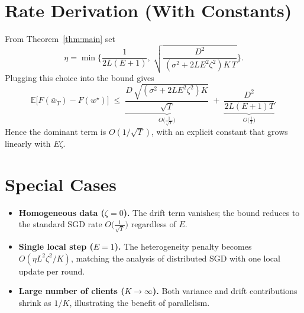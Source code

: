 \documentclass[11pt]{article}
\newcommand{\E}{\mathbb{E}}
\begin{document}
\section*{Rate Derivation (With Constants)}
From Theorem~\ref{thm:main} set
\[
\eta = \min\Big\{\frac{1}{2L(E+1)},\;\sqrt{\frac{D^2}{\,(\sigma^2+2L E^2\zeta^2)K\,T}}\Big\}.
\]
Plugging this choice into the bound gives
\[
\E\!\big[F(\bar w_T)-F(w^\star)\big]
\;\le\;
\underbrace{\frac{D\,\sqrt{(\sigma^2+2L E^2\zeta^2)K}}{\sqrt{T}}}_{\displaystyle O\!\big(\tfrac{1}{\sqrt{T}}\big)}
\;+\;
\underbrace{\frac{D^2}{2L(E+1)T}}_{\displaystyle O\!\big(\tfrac{1}{T}\big)} .
\]
Hence the dominant term is $O(1/\sqrt{T})$, with an explicit constant that grows linearly with $E\zeta$.

\section*{Special Cases}
\begin{itemize}
\item \textbf{Homogeneous data ($\zeta=0$).} The drift term vanishes; the bound reduces to the standard SGD rate $O\!\big(\frac{1}{\sqrt{T}}\big)$ regardless of $E$.
\item \textbf{Single local step ($E=1$).} The heterogeneity penalty becomes $O(\eta L^2\zeta^2/K)$, matching the analysis of distributed SGD with one local update per round.
\item \textbf{Large number of clients ($K\to\infty$).} Both variance and drift contributions shrink as $1/K$, illustrating the benefit of parallelism.
\end{itemize}
\end{document}
